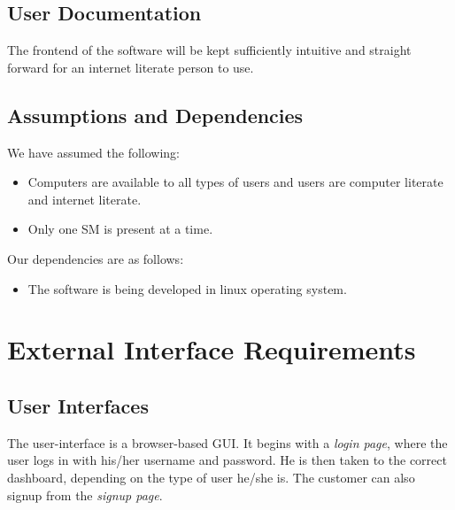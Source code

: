 \documentclass{scrreprt}
\begin{document}
\section{User Documentation}

The frontend of the software will be kept sufficiently intuitive and straight forward for an internet literate person to use.

\section{Assumptions and Dependencies}

We have assumed the following: 
\begin{itemize}
	\item Computers are available to all types of users and users are computer literate and internet literate.
	
	\item Only one SM is present at a time. 
	
\end{itemize}

Our dependencies are as follows:
\begin{itemize}
	\item The software is being developed in linux operating system.
\end{itemize}


\chapter{External Interface Requirements}

\section{User Interfaces}
The user-interface is a browser-based GUI. It begins with a \emph{login page}, where the user logs in with his/her username and password. He is then taken to the correct dashboard, depending on the type of user he/she is. The customer can also signup from the \emph{signup page}.
\end{document}
